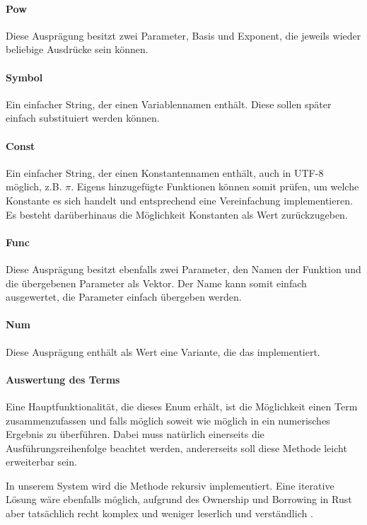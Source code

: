 \documentclass[11pt,a4paper, ngerman]{article}
\begin{document}
\paragraph{Pow} Diese Ausprägung besitzt zwei Parameter, Basis und Exponent, die jeweils wieder beliebige Ausdrücke sein können.

\paragraph{Symbol} Ein einfacher String, der einen Variablennamen enthält. Diese sollen später einfach substituiert werden können.

\paragraph{Const} Ein einfacher String, der einen Konstantennamen enthält, auch in UTF-8 möglich, z.B. $\pi$. Eigens hinzugefügte Funktionen können somit prüfen, um welche Konstante es sich handelt und entsprechend eine Vereinfachung implementieren. Es besteht darüberhinaus die Möglichkeit Konstanten als Wert zurückzugeben.

\paragraph{Func} Diese Ausprägung besitzt ebenfalls zwei Parameter, den Namen der Funktion und die übergebenen Parameter als Vektor. Der Name kann somit einfach ausgewertet, die Parameter einfach übergeben werden.

\paragraph{Num} Diese Ausprägung enthält als Wert eine Variante, die das   implementiert.

\paragraph{Auswertung des Terms} Eine Hauptfunktionalität, die dieses Enum erhält, ist die Möglichkeit einen Term zusammenzufassen und falls möglich soweit wie möglich in ein numerisches Ergebnis zu überführen. Dabei muss natürlich einerseits die Ausführungsreihenfolge beachtet werden, andererseits soll diese Methode leicht erweiterbar sein.

In unserem System wird die Methode rekursiv implementiert. Eine iterative Lösung wäre ebenfalls möglich, aufgrund des Ownership und Borrowing in Rust aber tatsächlich recht komplex und weniger leserlich und verständlich \cite{RustRecToItAst}.
\end{document}

